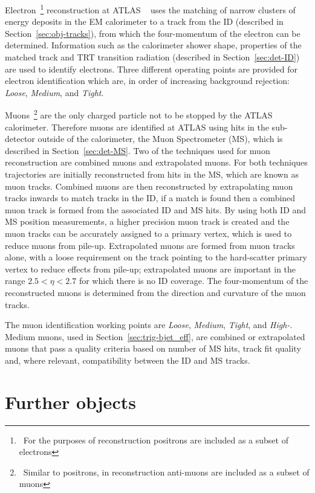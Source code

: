 Electron~\footnote{\ For the purposes of reconstruction positrons are included as a subset of electrons}
reconstruction at ATLAS ~\cite{obj-electrons} uses
the matching of narrow clusters of energy deposits in the EM calorimeter
to a track from the ID (described in Section~\ref{sec:obj-tracks}),
from which the four-momentum of the electron can be determined.
Information such as the calorimeter shower shape,
properties of the matched track
and TRT transition radiation (described in Section~\ref{sec:det-ID})
are used to identify electrons.
Three different operating points are provided for electron identification
which are, in order of increasing background rejection:
\textit{Loose}, \textit{Medium}, and \textit{Tight}. 

Muons~\footnote{\ Similar to positrons, in reconstruction anti-muons are included as a subset of muons}
are the only charged particle not to be stopped by the ATLAS calorimeter.
Therefore muons are identified at ATLAS using hits in the sub-detector outside of the calorimeter, the Muon Spectrometer (MS), which is described in Section~\ref{sec:det-MS}.
Two of the techniques used for muon reconstruction are combined muons and extrapolated muons.
For both techniques trajectories are initially reconstructed from hits in the MS, which are known as muon tracks.
Combined muons are then reconstructed by extrapolating muon tracks inwards to match tracks in the ID,
if a match is found then a combined muon track is formed from the associated ID and MS hits.
By using both ID and MS position measurements, a higher precision muon track is created
and the muon tracks can be accurately assigned to a primary vertex, which is used to reduce muons from pile-up.
Extrapolated muons are formed from muon tracks alone,
with a loose requirement on the track pointing to the hard-scatter primary vertex to reduce effects from pile-up;
extrapolated muons are important in the range $2.5 < \eta < 2.7$ for which there is no ID coverage.
The four-momentum of the reconstructed muons is determined from the direction and curvature of the muon tracks.

The muon identification working points are \textit{Loose}, \textit{Medium}, \textit{Tight}, and \textit{High-\pT{}}.
Medium muons, used in Section~\ref{sec:trig-bjet_eff}, are combined or extrapolated muons that pass a quality criteria based on
number of MS hits, track fit quality and, where relevant, compatibility between the ID and MS tracks.

\newpage
\section{Further objects}
\label{sec:obj-further}

